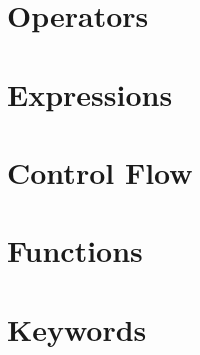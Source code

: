 \documentclass[12pt]{book}
\begin{document}
\section {Operators}

\section {Expressions}

\section {Control Flow}

\section {Functions}

\section {Keywords}
\end{document}
